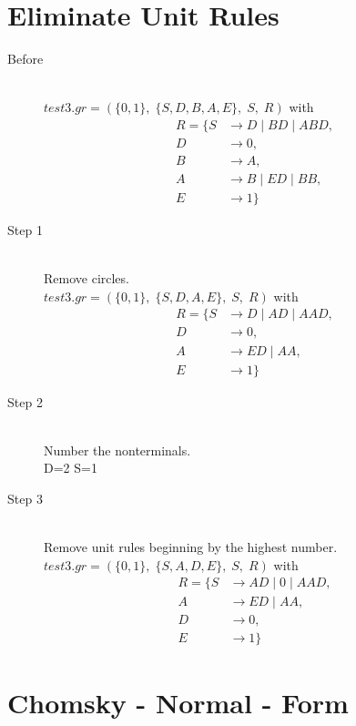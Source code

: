 \documentclass{article}
\begin{document}
\section{Eliminate Unit Rules}

\begin{description}
	\item[Before] \hfill \\ 
		$test3.gr=(\{	0, 1\},\;\{ S, D, B, A, E\},\;S,\;R)$ with
	\begin{align*}
		R=\{	S &\rightarrow D\;|\;BD\;|\;ABD, \\ 
		D &\rightarrow 0, \\ 
		B &\rightarrow A, \\ 
		A &\rightarrow B\;|\;ED\;|\;BB, \\ 
		E &\rightarrow 1\}
	\end{align*}
	\item[Step 1] \hfill \\ 
	Remove circles.\\ 
	$test3.gr=(\{	0, 1\},\;\{ S, D, A, E\},\;S,\;R)$ with
	\begin{align*}
		R=\{	S &\rightarrow D\;|\;AD\;|\;AAD, \\ 
		D &\rightarrow 0, \\ 
		A &\rightarrow ED\;|\;AA, \\ 
		E &\rightarrow 1\}
	\end{align*}
	\item[Step 2] \hfill \\ 
	Number the nonterminals.\\ 
	D=2 S=1 
	\item[Step 3] \hfill \\ 
	Remove unit rules beginning by the highest number.\\ 
	$test3.gr=(\{	0, 1\},\;\{ S, A, D, E\},\;S,\;R)$ with
	\begin{align*}
		R=\{	S &\rightarrow AD\;|\;0\;|\;AAD, \\ 
		A &\rightarrow ED\;|\;AA, \\ 
		D &\rightarrow 0, \\ 
		E &\rightarrow 1\}
	\end{align*}
\end{description}

\section{Chomsky - Normal - Form}
\end{document}
